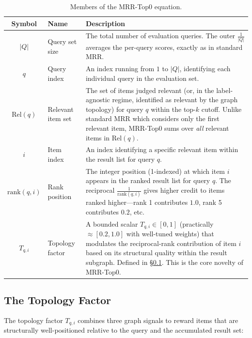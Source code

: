 \documentclass[11pt,a4paper]{article}
\begin{document}
\begin{table}[ht]
\centering
\caption{Members of the MRR-Top0 equation.}
\label{tab:members}
\begin{tabular}{@{}clp{8.2cm}@{}}
\toprule
\textbf{Symbol} & \textbf{Name} & \textbf{Description} \\
\midrule
$|Q|$ & Query set size &
  The total number of evaluation queries.  The outer $\frac{1}{|Q|}$ averages
  the per-query scores, exactly as in standard MRR. \\[6pt]
%
$q$ & Query index &
  An index running from $1$ to $|Q|$, identifying each individual query
  in the evaluation set. \\[6pt]
%
$\mathrm{Rel}(q)$ & Relevant item set &
  The set of items judged relevant (or, in the label-agnostic regime,
  identified as relevant by the graph topology) for query $q$ within the
  top-$k$ cutoff.  Unlike standard MRR which considers only the first
  relevant item, MRR-Top0 sums over \emph{all} relevant items in
  $\mathrm{Rel}(q)$. \\[6pt]
%
$i$ & Item index &
  An index identifying a specific relevant item within the result list
  for query $q$. \\[6pt]
%
$\mathrm{rank}(q,i)$ & Rank position &
  The integer position (1-indexed) at which item $i$ appears in the
  ranked result list for query $q$.  The reciprocal
  $\frac{1}{\mathrm{rank}(q,i)}$ gives higher credit to items ranked
  higher---rank 1 contributes $1.0$, rank 5 contributes $0.2$, etc. \\[6pt]
%
$T_{q,i}$ & Topology factor &
  A bounded scalar $T_{q,i} \in [0,1]$ (practically $\approx [0.2, 1.0]$
  with well-tuned weights) that modulates the reciprocal-rank contribution
  of item $i$ based on its structural quality within the result subgraph.
  Defined in \S\ref{sec:topofactor}.  This is the core novelty of
  MRR-Top0. \\
\bottomrule
\end{tabular}
\end{table}

\subsection{The Topology Factor}
\label{sec:topofactor}

The topology factor $T_{q,i}$ combines three graph signals to reward items
that are structurally well-positioned relative to the query and the
accumulated result set:
\end{document}
